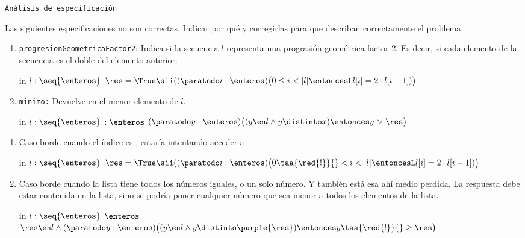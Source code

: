 \texttt{Análisis de especificación}
\begin{enunciado}{\ejercicio}
  Las siguientes especificaciones no son correctas. Indicar por qué y
  corregirlas para que describan correctamente el problema.
  \begin{enumerate}[label=\alph*)]
    \item \texttt{progresionGeometricaFactor2}: Indica si la secuencia $l$ representa una prograsión
          geométrica factor 2. Es decir, si cada elemento de la secuencia es el doble del elemento
          anterior.

          {in $l: \seq{\enteros}$}
          {\Bool}
          {\True}
          {$\res = \True \sii ((\paratodo i : \enteros) \bigl(0 \leq i < |l| \entoncesL l[i] = 2 \cdot l[i-1])\bigr)$}

    \item \texttt{minimo:} Devuelve en \res el menor elemento de $l$.

          {in $l:\seq{\enteros}$}
          {$:\enteros$}
          {\True}
          {$(\paratodo y : \enteros)\bigl( (y \en l \land y \distinto x) \entonces y > \res \bigr)$}

  \end{enumerate}
\end{enunciado}

\begin{enumerate}[label=\alph*)]
  \item Caso borde cuando el índice es , estaría intentando acceder a 

        {in $l: \seq{\enteros}$}
        {\Bool}
        {\True}
        {$\res = \True \sii ((\paratodo i : \enteros) \bigl(0 \taa{\red{!}}{}< i < |l| \entoncesL l[i] = 2 \cdot l[i-1])\bigr)$}

  \item Caso borde cuando la lista tiene todos los números iguales, o un solo número. Y también
        está esa  ahí medio perdida. La respuesta debe estar contenida en la lista, sino se podría poner cualquier
                número que sea menor a todos los elementos de la lista.\par
        {in $l:\seq{\enteros}$}
        {$\enteros$}
        {}
        {$\res \en l \land (\paratodo y : \enteros)\bigl( (y \en l \land y \distinto \purple{\res}) \entonces y \taa{\red{!}}{}\geq \res \bigr)$}
\end{enumerate}
